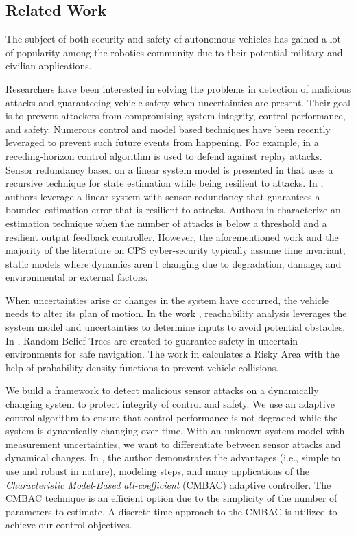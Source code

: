 \subsection{Related Work}
\label{sec:Related Work}

The subject of both security and safety of autonomous vehicles has gained a lot of popularity among the robotics community due to their potential military and civilian applications.

Researchers have been interested in solving the problems in detection of malicious attacks and guaranteeing vehicle safety when uncertainties are present. Their goal is to prevent attackers from compromising system integrity, control performance, and safety. Numerous control and model based techniques have been recently leveraged to prevent such future events from happening. For example, in \cite{zhu2012resilient} a receding-horizon control algorithm is used to defend against replay attacks. Sensor redundancy based on a linear system model is presented in \cite{6943080} that uses a recursive technique for state estimation while being resilient to attacks. In \cite{7330811}, authors leverage a linear system with sensor redundancy that guarantees a bounded estimation error that is resilient to attacks. Authors in \cite{fawzi2014secure} characterize an estimation technique when the number of attacks is below a threshold and a resilient output feedback controller. However, the aforementioned work and the majority of the literature on CPS cyber-security typically assume time invariant, static models where dynamics aren't changing due to degradation, damage, and environmental or external factors.


When uncertainties arise or changes in the system have occurred, the vehicle needs to alter its plan of motion. In the work \cite{8046382}, reachability analysis leverages the system model and uncertainties to determine inputs to avoid potential obstacles. In \cite{5980508}, Random-Belief Trees are created to guarantee safety in uncertain environments for safe navigation. The work in \cite{6934041} calculates a Risky Area with the help of probability density functions to prevent vehicle collisions. 


We build a framework to detect malicious sensor attacks on a dynamically changing system to protect integrity of control and safety. We use an adaptive control algorithm to ensure that control performance is not degraded while the system is dynamically changing over time. With an unknown system model with measurement uncertainties, we want to differentiate between sensor attacks and dynamical changes. In \cite{4106038}, the author demonstrates the advantages (i.e., simple to use and robust in nature), modeling steps, and many applications of the \textit{Characteristic Model-Based all-coefficient} (CMBAC) adaptive controller. The CMBAC technique is an efficient option due to the simplicity of the number of parameters to estimate. A discrete-time approach to the CMBAC is utilized to achieve our control objectives.

